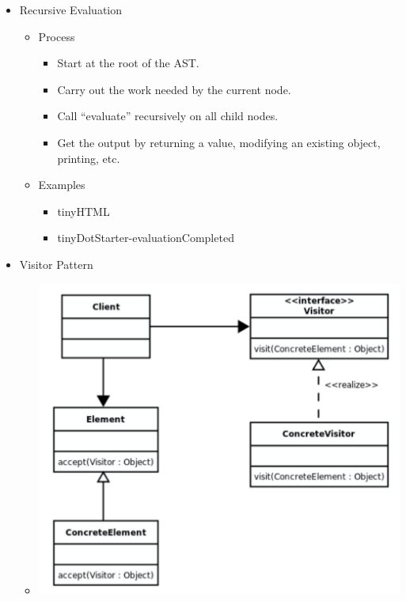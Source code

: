 \documentclass{article}
\begin{document}
\begin{itemize}
    \item Recursive Evaluation
    \begin{itemize}
        \item Process
        \begin{itemize}
            \item Start at the root of the AST.
            \item Carry out the work needed by the current node.
            \item Call ``evaluate'' recursively on all child nodes.
            \item Get the output by returning a value, modifying an existing object, printing, etc.
        \end{itemize}
        \item Examples
        \begin{itemize}
            \item tinyHTML
            \item tinyDotStarter-evaluationCompleted
        \end{itemize}
    \end{itemize}
    \item Visitor Pattern
    \begin{itemize}
        \item
        \begin{minipage}{\linewidth}
            \centering
            \includegraphics[width=\textwidth]{visitor_pattern}

\end{minipage}
\end{itemize}
\end{itemize}
\end{document}

